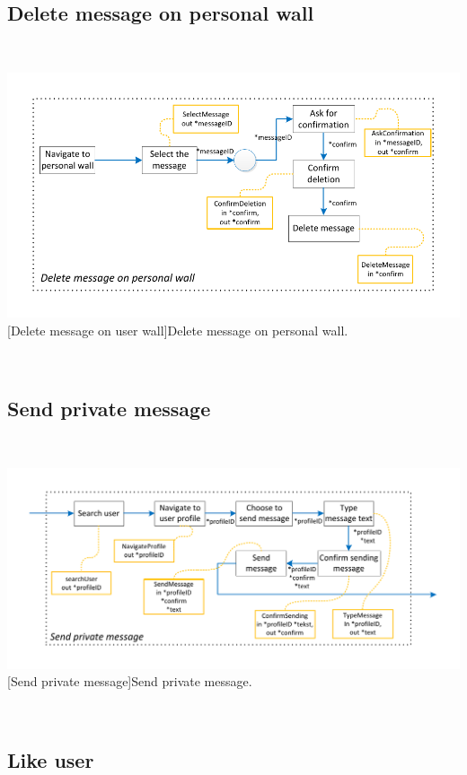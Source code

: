 \documentclass[11pt, a4paper,svglistings,oneside]{book}
\begin{document}
\subsection{Delete message on personal wall}

$\;$ \\
\noindent\begin{minipage}{\textwidth}
    \centering
   \includegraphics[scale=1]{nav_DeleteMessageOnWall.pdf}
 [Delete message on user wall]{Delete message on personal wall.}
\end{minipage}
$\;$ \\ 

\subsection{Send private message}

$\;$ \\
\noindent\begin{minipage}{\textwidth}
    \centering
   \includegraphics[scale=1]{nav_SendPrivateMessage.pdf}
 [Send private message]{Send private message.}
\end{minipage}
$\;$ \\ 

\subsection{Like user}
\end{document}
